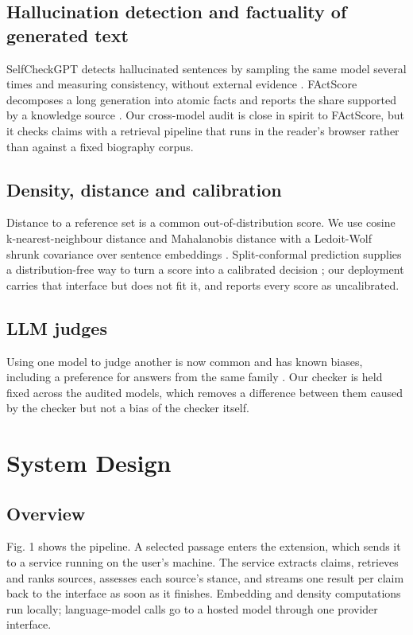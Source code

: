 \documentclass[conference]{IEEEtran}
\begin{document}
\subsection{Hallucination detection and factuality of generated text}

SelfCheckGPT detects hallucinated sentences by sampling the same model several times and measuring consistency, without external evidence \cite{manakul2023}. FActScore decomposes a long generation into atomic facts and reports the share supported by a knowledge source \cite{min2023}. Our cross-model audit is close in spirit to FActScore, but it checks claims with a retrieval pipeline that runs in the reader's browser rather than against a fixed biography corpus.

\subsection{Density, distance and calibration}

Distance to a reference set is a common out-of-distribution score. We use cosine k-nearest-neighbour distance and Mahalanobis distance \cite{mahalanobis1936} with a Ledoit-Wolf shrunk covariance \cite{ledoit2004} over sentence embeddings \cite{reimers2019,wang2020}. Split-conformal prediction supplies a distribution-free way to turn a score into a calibrated decision \cite{angelopoulos2021}; our deployment carries that interface but does not fit it, and reports every score as uncalibrated.

\subsection{LLM judges}

Using one model to judge another is now common and has known biases, including a preference for answers from the same family \cite{zheng2023}. Our checker is held fixed across the audited models, which removes a difference between them caused by the checker but not a bias of the checker itself.

\section{System Design}
\subsection{Overview}

Fig. 1 shows the pipeline. A selected passage enters the extension, which sends it to a service running on the user's machine. The service extracts claims, retrieves and ranks sources, assesses each source's stance, and streams one result per claim back to the interface as soon as it finishes. Embedding and density computations run locally; language-model calls go to a hosted model through one provider interface.
\end{document}
